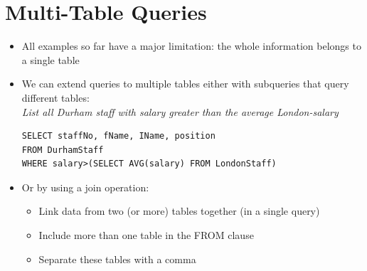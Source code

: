 \documentclass{article}[18pt]
\begin{document}
\section{Multi-Table Queries}
\begin{itemize}
	\item All examples so far have a major limitation: the whole information belongs to a single table
	\item We can extend queries to multiple tables either with subqueries that query different tables:\\
	\textit{List all Durham staff with salary greater than the average London-salary}
	\begin{verbatim}
SELECT staffNo, fName, IName, position
FROM DurhamStaff
WHERE salary>(SELECT AVG(salary) FROM LondonStaff)
	\end{verbatim}
	\item Or by using a join operation:
	\begin{itemize}
		\item Link data from two (or more) tables together (in a single query)
		\item Include more than one table in the FROM clause
		\item Separate these tables with a comma
	\end{itemize}
\end{itemize}
\end{document}
